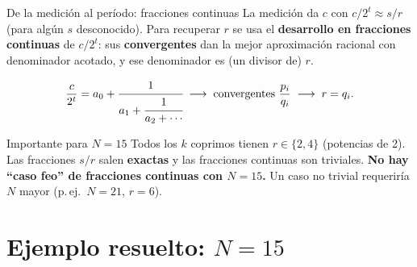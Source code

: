 \documentclass[aspectratio=169]{beamer}
\begin{document}
\begin{frame}{De la medición al período: fracciones continuas}
  La medición da $c$ con $c/2^t\approx s/r$ (para algún $s$ desconocido).
  Para recuperar $r$ se usa el \textbf{desarrollo en fracciones continuas}
  de $c/2^t$: sus \textbf{convergentes} dan la mejor aproximación racional
  con denominador acotado, y ese denominador es (un divisor de) $r$.

  \[
    \frac{c}{2^t} = a_0 + \cfrac{1}{a_1+\cfrac{1}{a_2+\cdots}}
    \;\longrightarrow\;
    \text{convergentes } \frac{p_i}{q_i}
    \;\longrightarrow\;
    r = q_i.
  \]

  \begin{exampleblock}{Importante para $N=15$}
    \small Todos los $k$ coprimos tienen $r\in\{2,4\}$ (potencias de 2).
    Las fracciones $s/r$ salen \textbf{exactas} y las fracciones continuas son
    triviales. \textbf{No hay ``caso feo'' de fracciones continuas con $N=15$.}
    Un caso no trivial requeriría $N$ mayor (p.\,ej.\ $N=21$, $r=6$).
  \end{exampleblock}

\end{frame}

\section{Ejemplo resuelto: $N=15$}
\end{document}

